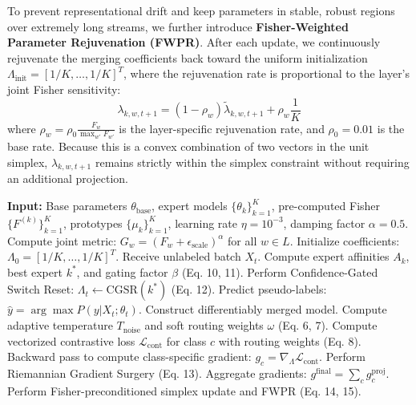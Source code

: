 \documentclass{article}
\theoremstyle{plain}
\theoremstyle{definition}
\theoremstyle{remark}
\begin{document}
To prevent representational drift and keep parameters in stable, robust regions over extremely long streams, we further introduce \textbf{Fisher-Weighted Parameter Rejuvenation (FWPR)}. After each update, we continuously rejuvenate the merging coefficients back toward the uniform initialization $\Lambda_{\text{init}} = [1/K, \dots, 1/K]^T$, where the rejuvenation rate is proportional to the layer's joint Fisher sensitivity:
\begin{equation}
\lambda_{k,w,t+1} = (1 - \rho_w) \tilde{\lambda}_{k,w,t+1} + \rho_w \frac{1}{K}
\end{equation}
where $\rho_w = \rho_0 \frac{F_w}{\max_{w'} F_{w'}}$ is the layer-specific rejuvenation rate, and $\rho_0 = 0.01$ is the base rate. Because this is a convex combination of two vectors in the unit simplex, $\lambda_{k,w,t+1}$ remains strictly within the simplex constraint without requiring an additional projection.

\begin{algorithm}[tb]
\caption{FOGS-Merge with CGSR and FWPR Algorithm}
\label{alg:fogs}
\begin{algorithmic}[1]
\STATE \textbf{Input:} Base parameters $\theta_{\text{base}}$, expert models $\{\theta_k\}_{k=1}^K$, pre-computed Fisher $\{F^{(k)}\}_{k=1}^K$, prototypes $\{\mu_k\}_{k=1}^K$, learning rate $\eta=10^{-3}$, damping factor $\alpha=0.5$.
\STATE Compute joint metric: $G_w = (F_w + \epsilon_{\text{scale}})^{\alpha}$ for all $w \in L$.
\STATE Initialize coefficients: $\Lambda_0 = [1/K, \dots, 1/K]^T$.
\STATE Receive unlabeled batch $X_t$.
\STATE Compute expert affinities $A_k$, best expert $k^*$, and gating factor $\beta$ (Eq. 10, 11).
\STATE Perform Confidence-Gated Switch Reset: $\Lambda_t \leftarrow \text{CGSR}(k^*)$ (Eq. 12).
\ENDIF
\STATE Predict pseudo-labels: $\hat{y} = \arg\max P(y|X_t; \theta_t)$.
\STATE Construct differentiably merged model.
\STATE Compute adaptive temperature $T_{\text{noise}}$ and soft routing weights $\omega$ (Eq. 6, 7).
\STATE Compute vectorized contrastive loss $\mathcal{L}_{\text{cont}}$ for class $c$ with routing weights (Eq. 8).
\STATE Backward pass to compute class-specific gradient: $g_c = \nabla_{\Lambda} \mathcal{L}_{\text{cont}}$.
\ENDFOR
\STATE Perform Riemannian Gradient Surgery (Eq. 13).
\STATE Aggregate gradients: $g^{\text{final}} = \sum_c g_c^{\text{proj}}$.
\STATE Perform Fisher-preconditioned simplex update and FWPR (Eq. 14, 15).
\ENDFOR
\end{algorithmic}
\end{algorithm}
\end{document}
